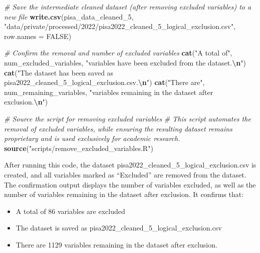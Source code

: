 \documentclass[
]{article}
\newenvironment{Shaded}{\begin{snugshade}}{\end{snugshade}}
\newcommand{\AttributeTok}[1]{\textcolor[rgb]{0.13,0.29,0.53}{#1}}
\newcommand{\CommentTok}[1]{\textcolor[rgb]{0.56,0.35,0.01}{\textit{#1}}}
\newcommand{\ConstantTok}[1]{\textcolor[rgb]{0.56,0.35,0.01}{#1}}
\newcommand{\FunctionTok}[1]{\textcolor[rgb]{0.13,0.29,0.53}{\textbf{#1}}}
\newcommand{\NormalTok}[1]{#1}
\newcommand{\SpecialCharTok}[1]{\textcolor[rgb]{0.81,0.36,0.00}{\textbf{#1}}}
\newcommand{\StringTok}[1]{\textcolor[rgb]{0.31,0.60,0.02}{#1}}
\begin{document}
\begin{Shaded}
\begin{Highlighting}[]
\CommentTok{\# Save the intermediate cleaned dataset (after removing excluded variables) to a new file}
\FunctionTok{write.csv}\NormalTok{(pisa\_data\_cleaned\_5, }\StringTok{"data/private/processed/2022/pisa2022\_cleaned\_5\_logical\_exclusion.csv"}\NormalTok{, }\AttributeTok{row.names =} \ConstantTok{FALSE}\NormalTok{)}

\CommentTok{\# Confirm the removal and number of excluded variables}
\FunctionTok{cat}\NormalTok{(}\StringTok{"A total of"}\NormalTok{, num\_excluded\_variables, }\StringTok{"variables have been excluded from the dataset.}\SpecialCharTok{\textbackslash{}n}\StringTok{"}\NormalTok{)}
\FunctionTok{cat}\NormalTok{(}\StringTok{"The dataset has been saved as \textquotesingle{}pisa2022\_cleaned\_5\_logical\_exclusion.csv\textquotesingle{}.}\SpecialCharTok{\textbackslash{}n}\StringTok{"}\NormalTok{)}
\FunctionTok{cat}\NormalTok{(}\StringTok{"There are"}\NormalTok{, num\_remaining\_variables, }\StringTok{"variables remaining in the dataset after exclusion.}\SpecialCharTok{\textbackslash{}n}\StringTok{"}\NormalTok{)}
\end{Highlighting}
\end{Shaded}

\begin{Shaded}
\begin{Highlighting}[]
\CommentTok{\# Source the script for removing excluded variables}
\CommentTok{\# This script automates the removal of excluded variables, while ensuring the resulting dataset remains proprietary and is used exclusively for academic research.}
\FunctionTok{source}\NormalTok{(}\StringTok{"scripts/remove\_excluded\_variables.R"}\NormalTok{)}
\end{Highlighting}
\end{Shaded}

After running this code, the dataset
pisa2022\_cleaned\_5\_logical\_exclusion.csv is created, and all
variables marked as ``Excluded'' are removed from the dataset. The
confirmation output displays the number of variables excluded, as well
as the number of variables remaining in the dataset after exclusion. It
confirms that:

\begin{itemize}
\item
  A total of 86 variables are excluded
\item
  The dataset is saved as pisa2022\_cleaned\_5\_logical\_exclusion.csv
\item
  There are 1129 variables remaining in the dataset after exclusion.
\end{itemize}
\end{document}
